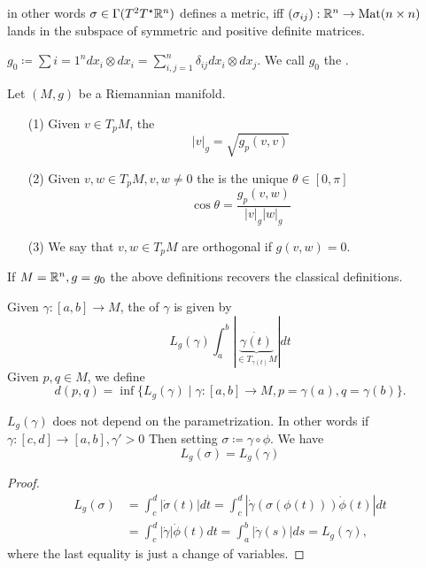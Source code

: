 in other words \(\sigma\in \Gamma(T^2 T^\star\mathbb{R}^n)\) defines a metric, iff
\((\sigma_{ij}):\mathbb{R}^n\to \text{Mat}(n\times n)\)
lands in the subspace of symmetric and positive definite matrices.

\begin{example}
    \(g_0\coloneqq \sum{i=1^n}dx_i\otimes dx_i=\sum_{i,j=1}^n \delta_{ij} dx_i\otimes dx_j\). We call 
    \(g_0\) the .
\end{example}

\begin{definition*}
    Let \((M,g)\) be a Riemannian manifold.
    \begin{enumerate}
        \item[(1)] Given \(v\in T_pM\), the  \[|v|_g=\sqrt{g_p(v,v)}\]
        \item[(2)] Given \(v,w\in T_pM,v,w\neq 0\) the  is the unique \(\theta\in [0,\pi]\)
                    \[\cos\theta = \frac{g_p(v,w)}{|v|_g|w|_g}\]
        \item[(3)] We say that \(v,w\in T_pM\) are orthogonal if \(g(v,w)=0\). 
    \end{enumerate} 
\end{definition*}

 If \(M=\mathbb{R}^n,g=g_0\) the above definitions recovers the classical definitions.

\begin{definition*}
    Given \(\gamma:[a,b]\to M\), the  of \(\gamma\) is given by 
    \[L_g(\gamma)\int_a^b|\underbrace{\dot{\gamma(t)}}_{\in T_{\gamma(t)}M}|dt\] 
    Given \(p,q\in M\), we define 
    \[d(p,q)=\inf \{L_g(\gamma)\mid \gamma:[a,b]\to M,  p=\gamma(a),q=\gamma(b)\}.\]
\end{definition*}

\begin{lemma}\label{lem:9.1}
    \(L_g(\gamma)\) does not depend on the parametrization. In other words if \(\gamma:[c,d]\to [a,b],\gamma'>0\)
    Then setting \(\sigma\coloneq \gamma\circ \phi\). We have 
    \[L_g(\sigma)=L_g(\gamma)\] 
\end{lemma}

\begin{proof}
    \begin{align*}
        L_g(\sigma)&=\int_c^d|\dot{\sigma}(t)|dt=\int_c^d|\dot{\gamma}(\sigma(\phi(t)))\dot{\phi}(t)|dt\\
        &=\int_c^d |\dot{\gamma}|\dot{\phi}(t)dt=\int_a^b|\dot{\gamma}(s)|ds=L_g(\gamma),
    \end{align*}
    where the last equality is just a change of variables.
\end{proof}

